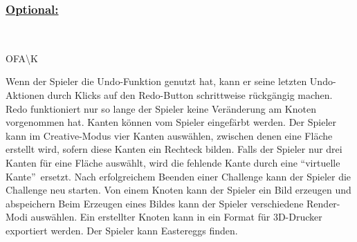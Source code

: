%
%
\subsubsection*{\underline{Optional:}}~\\


\begin{ids}{\gls{OFA\K}}

	\id[ 190] Wenn der Spieler die Undo-Funktion genutzt hat, kann er seine letzten Undo-Aktionen durch Klicks auf den Redo-Button schrittweise rückgängig machen. Redo funktioniert nur so lange der Spieler keine Veränderung am Knoten vorgenommen hat.
 	\id[ 200] Kanten können vom Spieler eingefärbt werden.
 	\id[ 210] Der Spieler kann im Creative-Modus vier Kanten auswählen, zwischen denen eine Fläche erstellt wird, sofern diese Kanten ein Rechteck bilden.
 	\id[ 220] Falls der Spieler nur drei Kanten für eine Fläche auswählt, wird  die fehlende Kante durch eine \textquotedblleft virtuelle Kante\textquotedblright~ersetzt.
 	\id [230] Nach erfolgreichem Beenden einer Challenge kann der Spieler die Challenge neu starten.
 	\id[ 240] Von einem Knoten kann der Spieler ein Bild erzeugen und abspeichern
 	\id[ 250] Beim Erzeugen eines Bildes kann der Spieler verschiedene Render-Modi auswählen.
 	\id[ 260] Ein erstellter Knoten kann in ein Format für 3D-Drucker exportiert werden.
 	\id[ 270] Der Spieler kann Eastereggs finden.
 	
	
\end{ids}

~\\